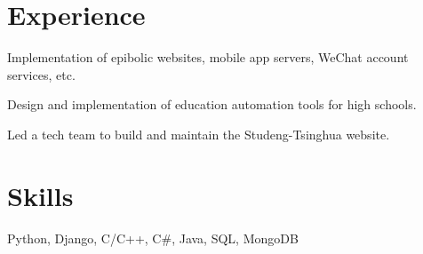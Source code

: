 \documentclass[a4paper]{rukh-cv}
\begin{document}
\begin{minipage}[t]{0.74\textwidth}
\sectionspace


\section{Experience}

\begin{tightitemize}
\item Implementation of epibolic websites, mobile app servers, WeChat account services, etc.
\item Design and implementation of education automation tools for high schools.
\end{tightitemize}

\sectionspace


\begin{tightitemize}
\item Led a tech team to build and maintain the Studeng-Tsinghua website.
\end{tightitemize}

\sectionspace


\section{Skills}

Python, Django, C/C++, C\#, Java, SQL, MongoDB

\sectionspace

\end{minipage}
\end{document}
